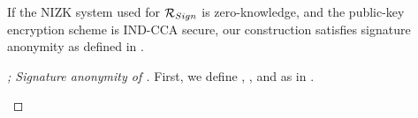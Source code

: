 \begin{theorem}
  \label{thm:sign-anonymity-uas}
  If the NIZK system used for $\mathcal{R}_{Sign}$ is zero-knowledge, and the
  public-key encryption scheme is IND-CCA secure, our \CUASGen construction
  satisfies signature anonymity as defined in .
\end{theorem}

\begin{proof}[; Signature anonymity of \CUASGen]
  \iffalse
  First, we define \SimSetup, \SIMOBTAIN, \SIMSIGN and \SIMOPEN as in
  .

  \begin{figure}[ht!]
    \begin{minipage}[t]{\textwidth}


\end{minipage}
\end{figure}
\end{proof}
